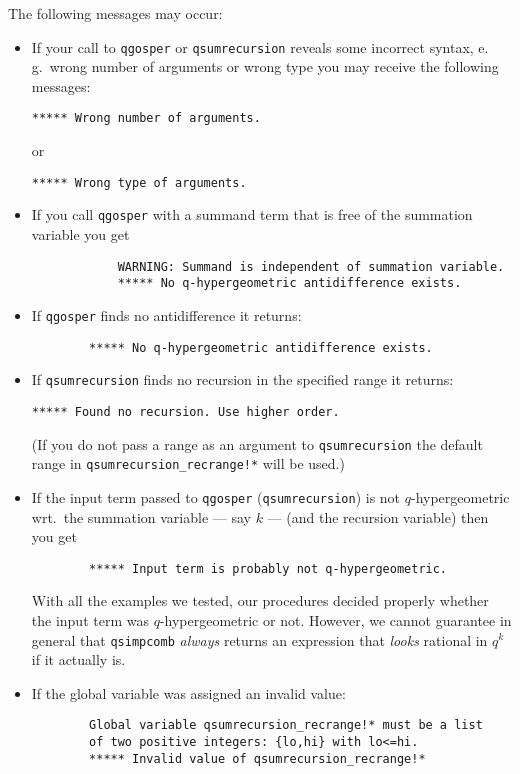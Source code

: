 The following messages may occur:
\begin{itemize}
%
	\item If your call to \texttt{qgosper} or \texttt{qsumrecursion}
		reveals some incorrect syntax, e.\,g.\ wrong number of 
		arguments or wrong type you may receive the following messages:
		\begin{verbatim}***** Wrong number of arguments.\end{verbatim}
		or
		\begin{verbatim}***** Wrong type of arguments.\end{verbatim}
%
	\item If you call \texttt{qgosper} with a summand term that
		is free of the summation variable you get
		\begin{verbatim}
			WARNING: Summand is independent of summation variable.
			***** No q-hypergeometric antidifference exists.
		\end{verbatim}
%
%
	\item If \texttt{qgosper} finds no antidifference it returns:
		\begin{verbatim}
		***** No q-hypergeometric antidifference exists.
		\end{verbatim}
%
	\item If \texttt{qsumrecursion} finds no recursion in the specified
		range it returns:
		\begin{verbatim}***** Found no recursion. Use higher order.\end{verbatim}
		(If you do not pass a range as an argument to \texttt{qsumrecursion}
		the default range in \texttt{qsumrecursion\_recrange!*} will be used.)
%
	\item If the input term passed to \texttt{qgosper}
		(\texttt{qsumrecursion}) is not $q$-hyper\-geometric wrt.\ the 
		summation variable --- say $k$ --- (and the recursion variable) 
		then you get
		\begin{verbatim}
		***** Input term is probably not q-hypergeometric.
		\end{verbatim}
		With all the examples we tested, our procedures decided properly
		whether the input term was $q$-hypergeometric or not. However, we
		cannot guarantee in general that \texttt{qsimpcomb} \emph{always} returns
		an expression that \emph{looks} rational in $q^k$ if it actually is.
%
	\item If the global variable  was
		assigned an invalid value:
		\begin{verbatim}
		Global variable qsumrecursion_recrange!* must be a list
		of two positive integers: {lo,hi} with lo<=hi.
		***** Invalid value of qsumrecursion_recrange!* 
		\end{verbatim}
%
\end{itemize}


